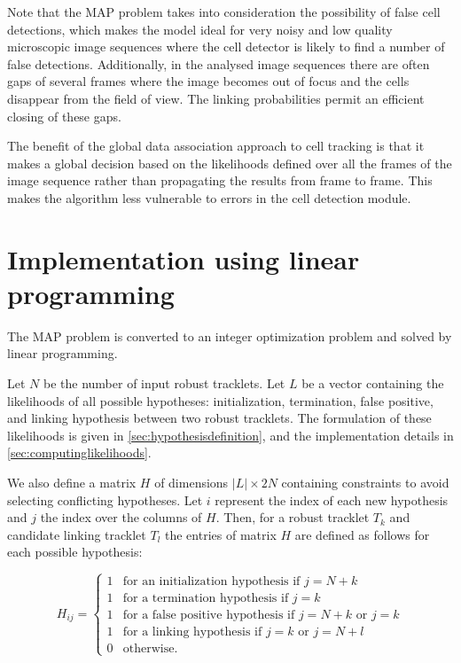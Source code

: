  	 	Note that the MAP problem takes into consideration the possibility of false cell detections, which makes the model ideal for very noisy and low quality microscopic image sequences where the cell detector is likely to find a number of false detections. Additionally, in the analysed image sequences there are often gaps of several frames where the image becomes out of focus and the cells disappear from the field of view. The linking probabilities permit an efficient closing of these gaps.
  	 	
  	 	The benefit of the global data association approach to cell tracking is that it makes a global decision based on the likelihoods defined over all the frames of the image sequence rather than propagating the results from frame to frame. This makes the algorithm less vulnerable to errors in the cell detection module.
  	 	
	\section{Implementation using linear programming}
		\label{sec:tracking_linearprogramming}
		The MAP problem is converted to an integer optimization problem and solved by linear programming.
		
		Let $N$ be the number of input robust tracklets. Let $L$ be a vector containing the likelihoods of all possible hypotheses: initialization, termination, false positive, and linking hypothesis between two robust tracklets. The formulation of these likelihoods is given in \cref{sec:hypothesisdefinition}, and the implementation details in \cref{sec:computinglikelihoods}.
		
		We also define a matrix $H$ of dimensions $|L| \times 2N$ containing constraints to avoid selecting conflicting hypotheses. Let $i$ represent the index of each new hypothesis and $j$ the index over the columns of $H$. Then, for a robust tracklet $T_k$ and candidate linking tracklet $T_l$ the entries of matrix $H$ are defined as follows for each possible hypothesis:
		
		\[
			H_{ij} = \begin{cases}
			1 & \text{for an initialization hypothesis if } j = N + k \\
			1 & \text{for a termination hypothesis if } j = k \\
			1 & \text{for a false positive hypothesis if } j = N + k \text{ or } j = k \\
			1 & \text{for a linking hypothesis if } j = k \text{ or } j = N + l \\
			0 & \text{otherwise.}
			\end{cases}
		\]
		

